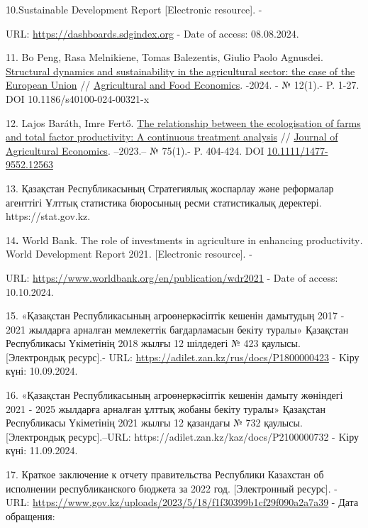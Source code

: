 {{10.Sustainable Development Report {[}Electronic resource{]}. -

URL: \url{https://dashboards.sdgindex.org} - Date of access: 08.08.2024.

11. Bo Peng, Rasa Melnikiene, Tomas Balezentis, Giulio Paolo Agnusdei.
\href{https://ideas.repec.org/a/spr/agfoec/v12y2024i1d10.1186_s40100-024-00321-x.html}{Structural
dynamics and sustainability in the agricultural sector: the case of the
European Union} //
\href{https://ideas.repec.org/s/spr/agfoec.html}{Agricultural and Food
Economics}. -2024. - № 12(1).- P. 1-27. DOI 10.1186/s40100-024-00321-x

12. Lajos Baráth, Imre Fertő.
\href{https://ideas.repec.org/a/bla/jageco/v75y2024i1p404-424.html}{The
relationship between the ecologisation of farms and total factor
productivity: A continuous treatment analysis} //
\href{https://ideas.repec.org/s/bla/jageco.html}{Journal of Agricultural
Economics}. --2023.-- № 75(1).- P. 404-424. DOI
\href{http://dx.doi.org/10.1111/1477-9552.12563}{10.1111/1477-9552.12563}

13. Қазақстан Республикасының Стратегиялық жоспарлау және реформалар
агенттігі Ұлттық статистика бюросының ресми статистикалық деректері.
https://stat.gov.kz.

14{\bfseries .} World Bank. The role of investments in agriculture in
enhancing productivity\emph{.} World Development Report 2021\emph{.}
{[}Electronic resource{]}. -

URL: \url{https://www.worldbank.org/en/publication/wdr2021} - Date of
access: 10.10.2024.

15. «Қазақстан Республикасының агроөнеркәсіптік кешенін дамытудың 2017 -
2021 жылдарға арналған мемлекеттік бағдарламасын бекіту туралы»
Қазақстан Республикасы Үкіметінің 2018 жылғы 12 шілдедегі № 423 қаулысы.
{[}Электрондық ресурс{]}.- URL:
\url{https://adilet.zan.kz/rus/docs/P1800000423} - Kіру күні:
10.09.2024.

16. «Қазақстан Республикасының агроөнеркәсіптік кешенін дамыту жөніндегі
2021 - 2025 жылдарға арналған ұлттық жобаны бекіту туралы» Қазақстан
Республикасы Үкіметінің 2021 жылғы 12 қазандағы № 732 қаулысы.
{[}Электрондық ресурс{]}.--URL:
https://adilet.zan.kz/kaz/docs/P2100000732 - Kіру күні: 11.09.2024.

17. Краткое заключение к отчету правительства Республики Казахстан об
исполнении республиканского бюджета за 2022 год. {[}Электронный
ресурс{]}. - URL:
\url{https://www.gov.kz/uploads/2023/5/18/f1f30399b1cf29f090a2a7a39} -
Дата обращения:

}}
